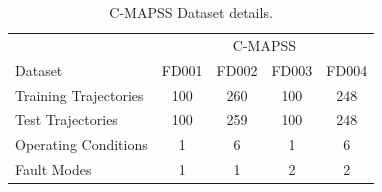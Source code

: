 \documentclass[12pt]{IEEEtran}%
\begin{document}



\clearpage


\onecolumn%

\begin{table}
\begin{center}
\caption{C-MAPSS Dataset details.}%
%

\begin{tabular}
[c]{l|cccc}\hline
& \multicolumn{4}{c}{C-MAPSS}\\
Dataset & FD001 & FD002 & FD003 & FD004\\\hline\hline
Training Trajectories & 100 & 260 & 100 & 248\\
Test Trajectories & 100 & 259 & 100 & 248\\
Operating Conditions & 1 & 6 & 1 & 6\\
Fault Modes & 1 & 1 & 2 & 2\\\hline
\end{tabular}
\label{TabCMAPSS}%

\end{center}
\end{table}
%
\end{document}
